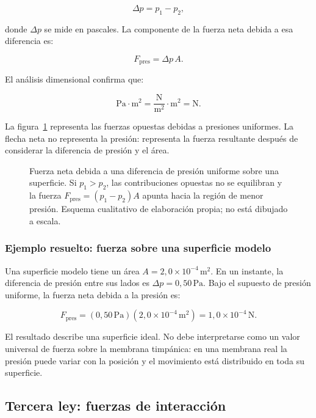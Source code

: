 \[
    \Delta p=p_1-p_2,
\]

donde \(\Delta p\) se mide en pascales. La componente de la fuerza neta debida a esa diferencia es:

\begin{equation}
    F_\mathrm{pres}=\Delta p\,A.
    \label{eq:u2-presion-fuerza}
\end{equation}

El análisis dimensional confirma que:

\[
    \text{Pa}\cdot\text{m}^{2}
    =\frac{\text{N}}{\text{m}^{2}}\cdot\text{m}^{2}
    =\text{N}.
\]

La figura~\ref{fig:u2-fuerza-area} representa las fuerzas opuestas debidas a
presiones uniformes. La flecha neta no representa la presión: representa la
fuerza resultante después de considerar la diferencia de presión y el área.

\begin{figure}[htbp]
    \centering
    
    \caption{Fuerza neta debida a una diferencia de presión uniforme sobre una
    superficie. Si \(p_1>p_2\), las contribuciones opuestas no se equilibran y
    la fuerza \(F_\mathrm{pres}=(p_1-p_2)A\) apunta hacia la región de menor
    presión. Esquema cualitativo de elaboración propia; no está dibujado a
    escala.}
    \label{fig:u2-fuerza-area}
\end{figure}

\subsubsection*{Ejemplo resuelto: fuerza sobre una superficie modelo}

Una superficie modelo tiene un área \(A=2{,}0\times10^{-4}\,\text{m}^{2}\). En un instante, la diferencia de presión entre sus lados es \(\Delta p=0{,}50\,\text{Pa}\). Bajo el supuesto de presión uniforme, la fuerza neta debida a la presión es:

\[
    F_\mathrm{pres}
    =(0{,}50\,\text{Pa})(2{,}0\times10^{-4}\,\text{m}^{2})
    =1{,}0\times10^{-4}\,\text{N}.
\]

El resultado describe una superficie ideal. No debe interpretarse como un valor universal de fuerza sobre la membrana timpánica: en una membrana real la presión puede variar con la posición y el movimiento está distribuido en toda su superficie.

\subsection{Tercera ley: fuerzas de interacción}
\label{sec:u2-tercera-ley}

